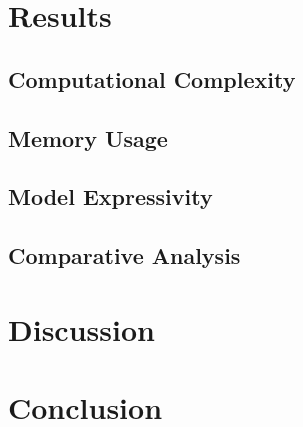 \documentclass[12pt]{article}
\begin{document}
\section{Results}
\label{sec:results}

\subsection{Computational Complexity}
\subsection{Memory Usage}
\subsection{Model Expressivity}
\subsection{Comparative Analysis}

\section{Discussion}
\label{sec:discussion}

\section{Conclusion}
\label{sec:conclusion}

\printbibliography
\end{document}

